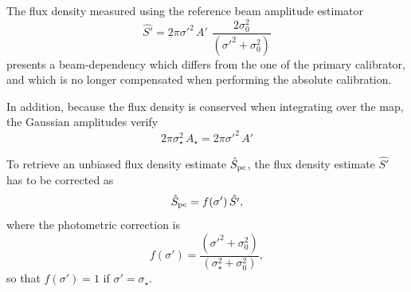 The flux density measured using the reference beam amplitude estimator 
\begin{equation}
  \hat{S'}  =2\pi \sigma'^2 \, A' \, \,  \frac{2 \sigma_0^2}{(\sigma'^2 + \sigma_0^2)}
\end{equation}
presents a beam-dependency which differs from the one of the primary
calibrator, and which is no longer compensated when performing the
absolute calibration.

{\lp In addition, because the flux density is conserved when integrating over the map,
the Gaussian amplitudes verify
\begin{equation}
2\pi \sigma_{\star}^2 \, A_{\star} = 2\pi \sigma'^2 \, A'
\label{eq:gaussian_amplitude}
\end{equation}}

To retrieve an unbiased flux density estimate $\hat{S}_{\rm{pc}}$, the
flux density estimate $\hat{S'}$ has to be corrected as
\begin{equation}
  \hat{S}_{\rm{pc}} = f(\sigma') \, \hat{S'},
\end{equation} 
where the photometric correction is 
\begin{equation}
  f(\sigma') = \frac{(\sigma'^2 + \sigma_0^2)}{(\sigma_\star^2+\sigma_0^2)}, 
\end{equation} 
so that $f(\sigma') = 1$ if $\sigma'=\sigma_\star$.

